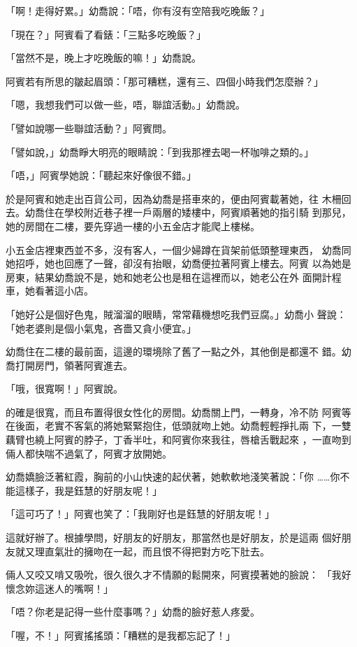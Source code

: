「啊！走得好累。」幼喬說：「唔，你有沒有空陪我吃晚飯？」

「現在？」阿賓看了看錶：「三點多吃晚飯？」

「當然不是，晚上才吃晚飯的嘛！」幼喬說。

阿賓若有所思的皺起眉頭：「那可糟糕，還有三、四個小時我們怎麼辦？」

「嗯，我想我們可以做一些，唔，聯誼活動。」幼喬說。

「譬如說哪一些聯誼活動？」阿賓問。

「譬如說，」幼喬睜大明亮的眼睛說：「到我那裡去喝一杯咖啡之類的。」

「唔，」阿賓學她說：「聽起來好像很不錯。」

於是阿賓和她走出百貨公司，因為幼喬是搭車來的，便由阿賓載著她，往
木柵回去。幼喬住在學校附近巷子裡一戶兩層的矮樓中，阿賓順著她的指引騎
到那兒，她的房間在二樓，要先穿過一樓的小五金店才能爬上樓梯。

小五金店裡東西並不多，沒有客人，一個少婦蹲在貨架前低頭整理東西，
幼喬同她招呼，她也回應了一聲，卻沒有抬眼，幼喬便拉著阿賓上樓去。阿賓
以為她是房東，結果幼喬說不是，她和她老公也是租在這裡而以，她老公在外
面開計程車，她看著這小店。

「她好公是個好色鬼，賊溜溜的眼睛，常常藉機想吃我們豆腐。」幼喬小
聲說：「她老婆則是個小氣鬼，吝嗇又貪小便宜。」

幼喬住在二樓的最前面，這邊的環境除了舊了一點之外，其他倒是都還不
錯。幼喬打開房門，領著阿賓進去。

「哦，很寬啊！」阿賓說。

的確是很寬，而且布置得很女性化的房間。幼喬關上門，一轉身，冷不防
阿賓等在後面，老實不客氣的將她緊緊抱住，低頭就吻上她。幼喬輕輕掙扎兩
下，一雙藕臂也繞上阿賓的脖子，丁香半吐，和阿賓你來我往，唇槍舌戰起來
，一直吻到倆人都快喘不過氣了，阿賓才放開她。

幼喬嬌臉泛著紅霞，胸前的小山快速的起伏著，她軟軟地淺笑著說：「你
……你不能這樣子，我是鈺慧的好朋友呢！」

「這可巧了！」阿賓也笑了：「我剛好也是鈺慧的好朋友呢！」

這就好辦了。根據學問，好朋友的好朋友，那當然也是好朋友，於是這兩
個好朋友就又理直氣壯的擁吻在一起，而且恨不得把對方吃下肚去。

倆人又咬又啃又吸吮，很久很久才不情願的鬆開來，阿賓摸著她的臉說：
「我好懷念妳這迷人的嘴啊！」

「唔？你老是記得一些什麼事嗎？」幼喬的臉好惹人疼愛。

「喔，不！」阿賓搖搖頭：「糟糕的是我都忘記了！」

